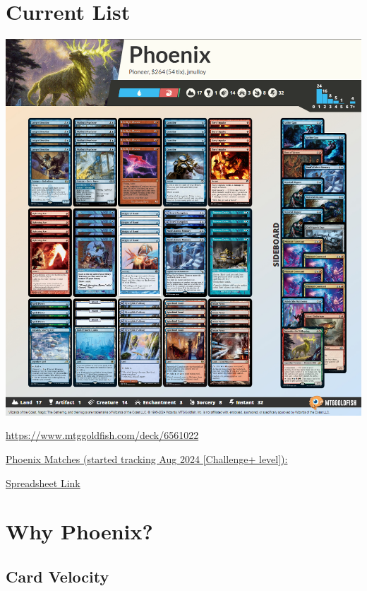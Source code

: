 \documentclass[12pt]{article}
\begin{document}
\section{Current List}
\begin{center}
    \href{https://www.mtggoldfish.com/deck/6561022#online}{\includegraphics[width=1\textwidth]{decklist}}

    \href{https://www.mtggoldfish.com/deck/6561022}{https://www.mtggoldfish.com/deck/6561022}

    \vspace{0.5cm}

    \href{https://docs.google.com/spreadsheets/d/1DheUoGrQmpuwzbMDpPVJHcCrfe7UOyXSMSSkL8aXnv0/edit?usp=sharing}{Phoenix Matches (started tracking Aug 2024 [Challenge+ level]):}

    \href{https://docs.google.com/spreadsheets/d/1DheUoGrQmpuwzbMDpPVJHcCrfe7UOyXSMSSkL8aXnv0/edit?usp=sharing}{Spreadsheet Link}
\end{center}

\clearpage
\section{Why Phoenix?}
\subsection{Card Velocity}
\end{document}
